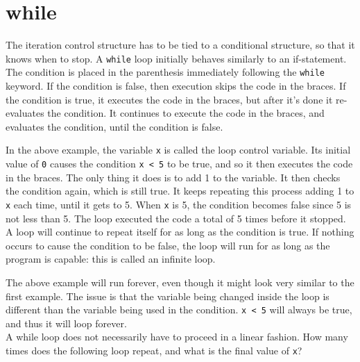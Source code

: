 \section{while}


The iteration control structure has to be tied to a conditional structure, so that it knows when to stop. A \texttt{while} loop initially behaves similarly to an if-statement. The condition is placed in the parenthesis immediately following the \texttt{while} keyword. If the condition is false, then execution skips the code in the braces. If the condition is true, it executes the code in the braces, but after it's done it re-evaluates the condition. It continues to execute the code in the braces, and evaluates the condition, until the condition is false.\\



In the above example, the variable \texttt{x} is called the loop control variable. Its initial value of \texttt{0} causes the condition \texttt{x < 5} to be true, and so it then executes the code in the braces. The only thing it does is to add 1 to the variable. It then checks the condition again, which is still true. It keeps repeating this process adding 1 to \texttt{x} each time, until it gets to 5. When \texttt{x} is 5, the condition becomes false since 5 is not less than 5. The loop executed the code a total of 5 times before it stopped.\\


A loop will continue to repeat itself for as long as the condition is true. If nothing occurs to cause the condition to be false, the loop will run for as long as the program is capable: this is called an infinite loop.\\


The above example will run forever, even though it might look very similar to the first example. The issue is that the variable being changed inside the loop is different than the variable being used in the condition. \texttt{x < 5} will always be true, and thus it will loop forever.\\

A while loop does not necessarily have to proceed in a linear fashion. How many times does the following loop repeat, and what is the final value of \texttt{x}?



